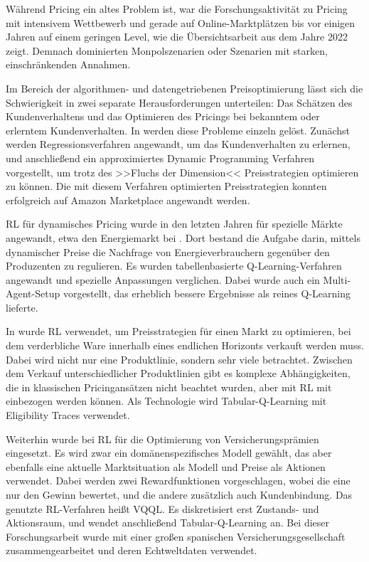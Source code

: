 Während Pricing ein altes Problem ist, war die Forschungsaktivität zu Pricing mit intensivem Wettbewerb und gerade auf Online-Marktplätzen bis vor einigen Jahren auf einem geringen Level, wie die Übersichtsarbeit \cite{Gerpott2022} aus dem Jahre 2022 zeigt.
Demnach dominierten Monpolszenarien oder Szenarien mit starken, einschränkenden Annahmen.

Im Bereich der algorithmen- und datengetriebenen Preisoptimierung lässt sich die Schwierigkeit in zwei separate Herausforderungen unterteilen: Das Schätzen des Kundenverhaltens und das Optimieren des Pricings bei bekanntem oder erlerntem Kundenverhalten.
In \cite{10.1145/3219819.3219833} werden diese Probleme einzeln gelöst.
Zunächst werden Regressionsverfahren angewandt, um das Kundenverhalten zu erlernen, und anschließend ein approximiertes Dynamic Programming Verfahren vorgestellt, um trotz des >>Fluchs der Dimension<< Preisstrategien optimieren zu können.
Die mit diesem Verfahren optimierten Preisstrategien konnten erfolgreich auf Amazon Marketplace angewandt werden.

RL für dynamisches Pricing wurde in den letzten Jahren für spezielle Märkte angewandt, etwa den Energiemarkt bei \cite{Kim2016DynamicPA}.
Dort bestand die Aufgabe darin, mittels dynamischer Preise die Nachfrage von Energieverbrauchern gegenüber den Produzenten zu regulieren.
Es wurden tabellenbasierte Q-Learning-Verfahren angewandt und spezielle Anpassungen verglichen.
Dabei wurde auch ein Multi-Agent-Setup vorgestellt, das erheblich bessere Ergebnisse als reines Q-Learning lieferte.

In \cite{RANA2015426} wurde RL verwendet, um Preisstrategien für einen Markt zu optimieren, bei dem verderbliche Ware innerhalb eines endlichen Horizonts verkauft werden muss.
Dabei wird nicht nur eine Produktlinie, sondern sehr viele betrachtet.
Zwischen dem Verkauf unterschiedlicher Produktlinien gibt es komplexe Abhängigkeiten, die in klassischen Pricingansätzen nicht beachtet wurden, aber mit RL mit einbezogen werden können.
Als Technologie wird Tabular-Q-Learning mit Eligibility Traces verwendet.

Weiterhin wurde bei \cite{KRASHENINNIKOVA20198} RL für die Optimierung von Versicherungsprämien eingesetzt.
Es wird zwar ein domänenspezifisches Modell gewählt, das aber ebenfalls eine aktuelle Marktsituation als Modell und Preise als Aktionen verwendet.
Dabei werden zwei Rewardfunktionen vorgeschlagen, wobei die eine nur den Gewinn bewertet, und die andere zusätzlich auch Kundenbindung.
Das genutzte RL-Verfahren heißt VQQL.
Es diskretisiert erst Zustands- und Aktionsraum, und wendet anschließend Tabular-Q-Learning an.
Bei dieser Forschungsarbeit wurde mit einer großen spanischen Versicherungsgesellschaft zusammengearbeitet und deren Echtweltdaten verwendet.

